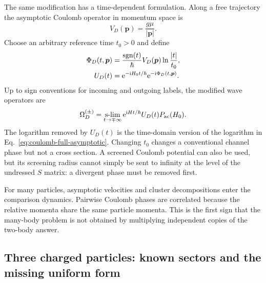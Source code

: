 The same modification has a time-dependent formulation.  Along a free
trajectory the asymptotic Coulomb operator in momentum space is
\begin{equation}
  V_D(\bm p)=\frac{g\mu}{|\bm p|}.
  \label{eq:dollard-asymptotic-potential}
\end{equation}
Choose an arbitrary reference time $t_0>0$ and define
\begin{align}
  \Phi_D(t,\bm p)
  &=\frac{\operatorname{sgn}(t)}{\hbar}
  V_D(\bm p)\ln\frac{|t|}{t_0},
  \label{eq:dollard-phase}\\
  U_D(t)
  &=\mathrm{e}^{-\mathrm{i} H_0t/\hbar}
  \mathrm{e}^{-\mathrm{i}\Phi_D(t,\bm p)} .
  \label{eq:dollard-comparison-dynamics}
\end{align}
Up to sign conventions for incoming and outgoing labels, the modified wave
operators are
\begin{equation}
  \Omega_D^{(\pm)}
  =\operatorname*{s-lim}_{t\to\mp\infty}
  \mathrm{e}^{\mathrm{i} Ht/\hbar}U_D(t)P_{\mathrm{ac}}(H_0).
  \label{eq:dollard-wave-operators}
\end{equation}
The logarithm removed by $U_D(t)$ is the time-domain version of the logarithm
in Eq.~\eqref{eq:coulomb-full-asymptotic}.  Changing $t_0$ changes a
conventional channel phase but not a cross section.  A screened Coulomb
potential can also be used, but its screening radius cannot simply be sent to
infinity at the level of the undressed $S$ matrix: a divergent phase must be
removed first.

For many particles, asymptotic velocities and cluster decompositions enter
the comparison dynamics.  Pairwise Coulomb phases are correlated because the
relative momenta share the same particle momenta.  This is the first sign that
the many-body problem is not obtained by multiplying independent copies of
the two-body answer.

\subsection{Three charged particles: known sectors and the missing uniform form}
\label{subsec:three-body-coulomb}

